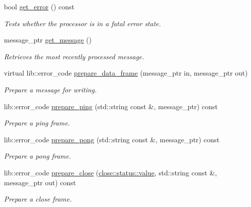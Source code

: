 \begin{DoxyCompactItemize}
bool \mbox{\hyperlink{classwebsocketpp_1_1processor_1_1hybi00_a86ed2943be17c9775153a9731289c16e}{get\+\_\+error}} () const
\begin{DoxyCompactList}\small\item\em Tests whether the processor is in a fatal error state. \end{DoxyCompactList}\item 
message\+\_\+ptr \mbox{\hyperlink{classwebsocketpp_1_1processor_1_1hybi00_af5f3b4bec38c586e31c0574b6c3f56b8}{get\+\_\+message}} ()
\begin{DoxyCompactList}\small\item\em Retrieves the most recently processed message. \end{DoxyCompactList}\item 
virtual lib\+::error\+\_\+code \mbox{\hyperlink{classwebsocketpp_1_1processor_1_1hybi00_a919aaed345cab679875be1d95c7302ec}{prepare\+\_\+data\+\_\+frame}} (message\+\_\+ptr in, message\+\_\+ptr out)
\begin{DoxyCompactList}\small\item\em Prepare a message for writing. \end{DoxyCompactList}\item 
lib\+::error\+\_\+code \mbox{\hyperlink{classwebsocketpp_1_1processor_1_1hybi00_a19b26fd77f07fb74cf654c5c6976cac3}{prepare\+\_\+ping}} (std\+::string const \&, message\+\_\+ptr) const
\begin{DoxyCompactList}\small\item\em Prepare a ping frame. \end{DoxyCompactList}\item 
lib\+::error\+\_\+code \mbox{\hyperlink{classwebsocketpp_1_1processor_1_1hybi00_a1c9e4bf4f5b73e61bee7950c439a77db}{prepare\+\_\+pong}} (std\+::string const \&, message\+\_\+ptr) const
\begin{DoxyCompactList}\small\item\em Prepare a pong frame. \end{DoxyCompactList}\item 
lib\+::error\+\_\+code \mbox{\hyperlink{classwebsocketpp_1_1processor_1_1hybi00_a907203cad667afdf85359b6ebb68a866}{prepare\+\_\+close}} (\mbox{\hyperlink{namespacewebsocketpp_1_1close_1_1status_a8614a5c4733d708e2d2a32191c5bef84}{close\+::status\+::value}}, std\+::string const \&, message\+\_\+ptr out) const
\begin{DoxyCompactList}\small\item\em Prepare a close frame. \end{DoxyCompactList}\end{DoxyCompactItemize}
